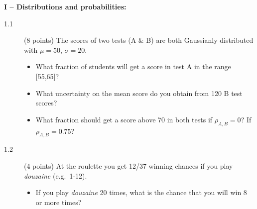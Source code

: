 \documentclass[11pt]{article}
\begin{document}
\vspace{4ex}
\noindent
{\bf I -- Distributions and probabilities:}
\begin{description}
  \item[1.1] (8 points)
  The scores of two tests (A \& B) are both Gaussianly distributed with $\mu=50$, $\sigma=20$.
  \vspace*{-1ex}
  \begin{itemize}
    \item What fraction of students will get a score in test A in the range [55,65]?
    \item What uncertainty on the mean score do you obtain from 120 B test scores?
    \item What fraction should get a score above 70 in both tests if $\rho_{A,B} = 0$? If $\rho_{A,B} = 0.75$?
  \end{itemize}
%
  \item[1.2] (4 points)
  At the roulette you get 12/37 winning chances if you play {\it douzaine} (e.g.\ 1-12).
  \vspace*{-1ex}
  \begin{itemize}
    \item If you play {\it douzaine} 20 times, what is the chance that you will win 8 or more times?
  \end{itemize}
\end{description}



\end{document}
